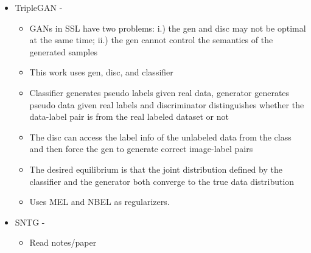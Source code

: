 \begin{itemize}
	\item TripleGAN - \cite{Li2017}
	\begin{itemize}
		\item GANs in SSL have two problems: i.) the gen and disc may not be optimal at the same time;
			ii.) the gen cannot control the semantics of the generated samples
		\item This work uses gen, disc, and classifier
		\item Classifier generates pseudo labels given real data, generator generates pseudo data given
			real labels and discriminator distinguishes whether the data-label pair is from the real
			labeled dataset or not
		\item The disc can access the label info of the unlabeled data from the class and then force the
			gen to generate correct image-label pairs
		\item The desired equilibrium is that the joint distribution defined by the classifier and the
			generator both converge to the true data distribution
		\item Uses MEL and NBEL as regularizers.
	\end{itemize}
	
	\item SNTG - \cite{Luo2017}
	\begin{itemize}
		\item Read notes/paper
	\end{itemize}
\end{itemize}
